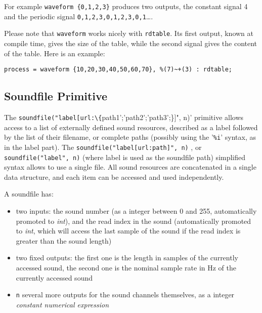 For example \lstinline'waveform {0,1,2,3}' produces two outputs, the constant signal 4 and the periodic signal \lstinline'0,1,2,3,0,1,2,3,0,1'\ldots.

Please note that \lstinline'waveform' works nicely with \lstinline'rdtable'. Its first output, known at compile time, gives the size of the table, while the second signal gives the content of the table. Here is an example:
\begin{lstlisting}
process = waveform {10,20,30,40,50,60,70}, %(7)~+(3) : rdtable;
\end{lstlisting}

\bigskip

\subsection{Soundfile Primitive}

The  \lstinline'soundfile("label[url:\{'path1';'path2';'path3';\}]", n)' primitive allows access to a list of externally defined sound resources, described as a label followed by the list of their filename, or complete paths (possibly using the '\texttt{\%i}' syntax, as in the label part). The \lstinline'soundfile("label[url:path]", n)' , or \lstinline'soundfile("label", n)' (where label is used as the soundfile path) simplified syntax allows to use a single file. All sound resources are concatenated in a single data structure, and each item can be accessed and used independently.

A soundfile has:

\begin{itemize}
	\item two inputs: the sound number (as a integer between 0 and 255, automatically promoted to \textit{int}), and the read index in the sound (automatically promoted to \textit{int}, which will access the last sample of the sound if the read index is greater than the sound length)
	\item two fixed outputs: the first one is the length in samples of the currently accessed sound, the second one is the nominal sample rate in Hz of the currently accessed sound
	\item  \lstinline'n' several more outputs for the sound channels themselves, as a integer \textit{constant numerical expression}
\end{itemize}

